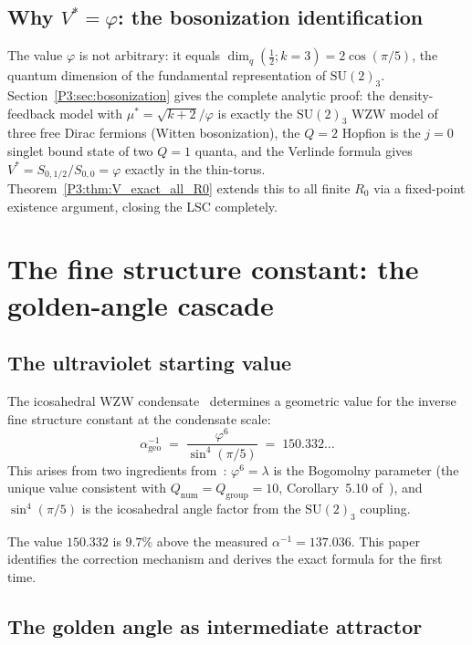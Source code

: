 \documentclass[11pt,a4paper]{article}
\theoremstyle{definition}
\theoremstyle{remark}
\newcommand{\vp}{\varphi}
\newcommand{\aInv}{\alpha^{-1}}
\begin{document}
\subsection{Why $V^* = \vp$: the bosonization identification}

The value $\vp$ is not arbitrary: it equals $\dim_q(\tfrac{1}{2};k{=}3) = 2\cos(\pi/5)$,
the quantum dimension of the fundamental representation of $\mathrm{SU}(2)_3$.
Section~\ref{P3:sec:bosonization} gives the complete analytic proof: the
density-feedback model with $\mu^* = \sqrt{k+2}/\vp$ is exactly the
$\mathrm{SU}(2)_3$ WZW model of three free Dirac fermions (Witten bosonization),
the $Q=2$ Hopfion is the $j=0$ singlet bound state of two $Q=1$ quanta, and the
Verlinde formula gives $V^* = S_{0,1/2}/S_{0,0} = \vp$ exactly in the thin-torus.
Theorem~\ref{P3:thm:V_exact_all_R0} extends this to all finite $R_0$ via a
fixed-point existence argument, closing the LSC completely.

\section{The fine structure constant: the golden-angle cascade}
\label{P3:sec:alpha}

\subsection{The ultraviolet starting value}

The icosahedral WZW condensate~\cite{Paper1} determines a geometric
value for the inverse fine structure constant at the condensate scale:
\begin{equation}
  \aInv_{\mathrm{geo}}
  \;=\; \frac{\vp^6}{\sin^4(\pi/5)}
  \;=\; 150.332\ldots
  \label{P3:eq:alpha_geo}
\end{equation}
This arises from two ingredients from~\cite{Paper1}: $\vp^6 = \lambda$
is the Bogomolny parameter (the unique value consistent with
$Q_{\mathrm{num}}=Q_{\mathrm{group}}=10$, Corollary~5.10 of~\cite{Paper1}),
and $\sin^4(\pi/5)$ is the icosahedral angle factor from the
$\mathrm{SU}(2)_3$ coupling.

The value $150.332$ is $9.7\%$ above the measured $\aInv = 137.036$.
This paper identifies the correction mechanism and derives the
exact formula for the first time.

\subsection{The golden angle as intermediate attractor}
\end{document}
